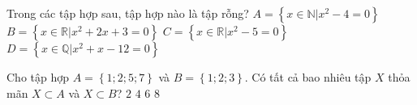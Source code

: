 \begin{ex}%
	Trong các tập hợp sau, tập hợp nào là tập rỗng?
	\choice
	{$A=\left\lbrace  x\in\mathbb{N}\big|x^2-4=0\right\rbrace $}
	{\True $B=\left\lbrace x\in\mathbb{R}\big|x^2+2x+3=0\right\rbrace $}
	{$C=\left\lbrace  x\in\mathbb{R}\big|x^2-5=0\right\rbrace $}
	{$D=\left\lbrace  x\in\mathbb{Q}\big|x^2+x-12=0\right\rbrace $}
\end{ex}
%
\begin{ex}%
	Cho tập hợp $A=\left\{ 1;2;5;7\right\}$ và $B=\left\{ 1;2;3\right\}$. Có tất cả bao nhiêu tập $X$ thỏa mãn $X\subset A$ và $X\subset B$?
	\choice
	{$2$}
	{\True $4$}
	{$6$}
	{$8$}
\end{ex}
%

